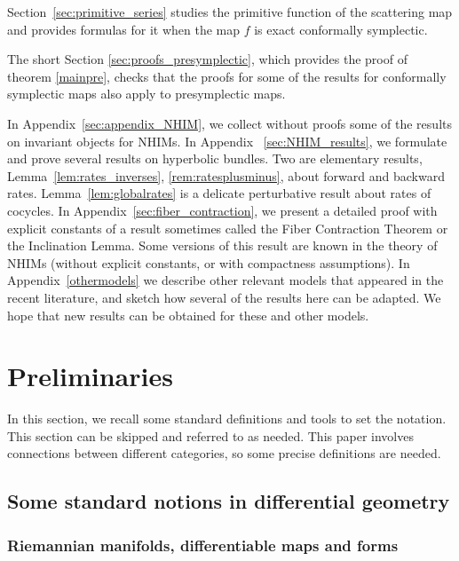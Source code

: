 \documentclass[11pt]{amsart}
\theoremstyle{definition}
\theoremstyle{remark}
\numberwithin{equation}{section}
\begin{document}
Section~\ref{sec:primitive_series} studies the
primitive function of the scattering map and provides formulas for it when the map $f$ is exact conformally symplectic.

The short Section
\ref{sec:proofs_presymplectic},  which provides the proof of theorem \ref{mainpre}, checks that   the proofs for some of the results for conformally symplectic maps   also apply to
presymplectic  maps.

In Appendix~\ref{sec:appendix_NHIM}, we  collect without proofs
some of the results on invariant objects for  NHIMs.
In Appendix ~\ref{sec:NHIM_results}, we   formulate  and prove   several
results on hyperbolic bundles. Two are  elementary results,
Lemma~\ref{lem:rates_inverses}, \ref{rem:ratesplusminus},
about forward and backward rates. Lemma~\ref{lem:globalrates}
is a delicate perturbative
result about rates of cocycles.
In Appendix~\ref{sec:fiber_contraction}, we present a detailed
proof with explicit constants of a result
sometimes called the  Fiber Contraction Theorem or the Inclination Lemma.
Some versions of this result are known in
the  theory of NHIMs (without
explicit constants, or with compactness assumptions).
In Appendix~\ref{othermodels} we describe other relevant models that appeared in
the recent literature, and sketch how several of the results here can be adapted.
We hope that  new results can be obtained for these and other
models.





\section{Preliminaries}
\label{sec:preliminaries}
In this section, we recall some standard definitions and tools to set the
notation.
This section  can be skipped and referred to as needed.  This paper involves
connections between different categories, so some precise definitions are
needed.


\subsection{Some standard notions in differential geometry}
\label{sec:prelimgeom}

\subsubsection{Riemannian manifolds, differentiable maps and forms}
\end{document}
